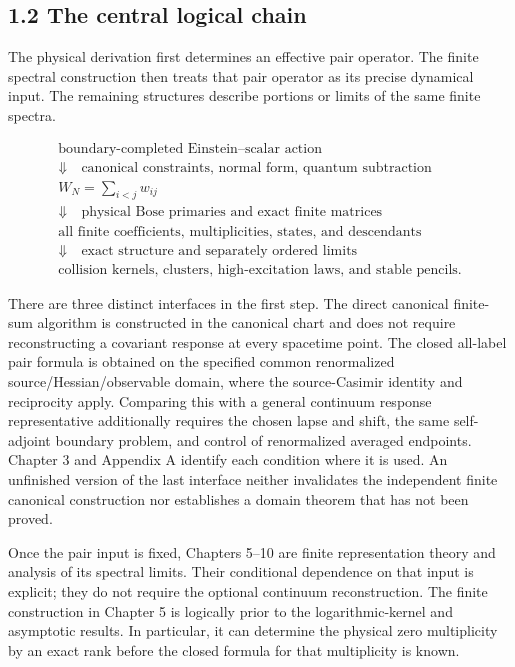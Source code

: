 \documentclass[a4paper,11pt]{article}
\numberwithin{equation}{section}
\begin{document}
\hypertarget{the-central-logical-chain}{%
\subsection{1.2 The central logical chain}\label{the-central-logical-chain}}

The physical derivation first determines an effective pair operator. The finite spectral construction then treats that pair operator as its precise dynamical input. The remaining structures describe portions or limits of the same finite spectra.

\[
\begin{gathered}
\text{boundary-completed Einstein--scalar action}\\
\Downarrow\quad\text{canonical constraints, normal form, quantum subtraction}\\
W_N=\displaystyle\sum_{i<j}w_{ij}\\
\Downarrow\quad\text{physical Bose primaries and exact finite matrices}\\
\text{all finite coefficients, multiplicities, states, and descendants}\\
\Downarrow\quad\text{exact structure and separately ordered limits}\\
\text{collision kernels, clusters, high-excitation laws, and stable pencils}.
\end{gathered}
\tag{1.2}
\]

There are three distinct interfaces in the first step. The direct canonical finite-sum algorithm is constructed in the canonical chart and does not require reconstructing a covariant response at every spacetime point. The closed all-label pair formula is obtained on the specified common renormalized source/Hessian/observable domain, where the source-Casimir identity and reciprocity apply. Comparing this with a general continuum response representative additionally requires the chosen lapse and shift, the same self-adjoint boundary problem, and control of renormalized averaged endpoints. Chapter 3 and Appendix A identify each condition where it is used. An unfinished version of the last interface neither invalidates the independent finite canonical construction nor establishes a domain theorem that has not been proved.

Once the pair input is fixed, Chapters 5--10 are finite representation theory and analysis of its spectral limits. Their conditional dependence on that input is explicit; they do not require the optional continuum reconstruction. The finite construction in Chapter 5 is logically prior to the logarithmic-kernel and asymptotic results. In particular, it can determine the physical zero multiplicity by an exact rank before the closed formula for that multiplicity is known.
\end{document}
